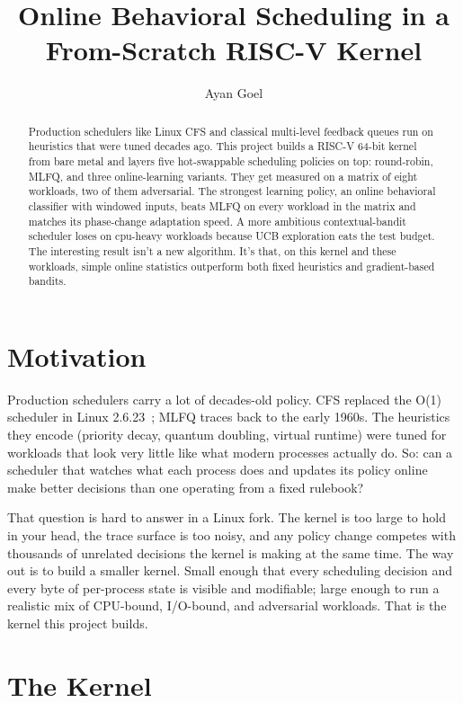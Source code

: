 \documentclass[11pt]{article}
\title{Online Behavioral Scheduling in a From-Scratch RISC-V Kernel}
\author{Ayan Goel}
\date{}
\begin{document}
\maketitle

\begin{abstract}
\noindent
Production schedulers like Linux CFS and classical multi-level feedback
queues run on heuristics that were tuned decades ago. This project builds a
RISC-V 64-bit kernel from bare metal and layers five hot-swappable scheduling
policies on top: round-robin, MLFQ, and three online-learning variants. They
get measured on a matrix of eight workloads, two of them adversarial. The
strongest learning policy, an online behavioral classifier with windowed
inputs, beats MLFQ on every workload in the matrix and matches its
phase-change adaptation speed. A more ambitious contextual-bandit scheduler
loses on cpu-heavy workloads because UCB exploration eats the test budget.
The interesting result isn't a new algorithm. It's that, on this kernel and
these workloads, simple online statistics outperform both fixed heuristics
and gradient-based bandits.
\end{abstract}

\section{Motivation}
\label{sec:motivation}

Production schedulers carry a lot of decades-old policy. CFS replaced the
O(1) scheduler in Linux 2.6.23~\cite{cfs}; MLFQ traces back to the early
1960s. The heuristics they encode (priority decay, quantum doubling, virtual
runtime) were tuned for workloads that look very little like what modern
processes actually do. So: can a scheduler that watches what each process
does and updates its policy online make better decisions than one operating
from a fixed rulebook?

That question is hard to answer in a Linux fork. The kernel is too large to
hold in your head, the trace surface is too noisy, and any policy change
competes with thousands of unrelated decisions the kernel is making at the
same time. The way out is to build a smaller kernel. Small enough that every
scheduling decision and every byte of per-process state is visible and
modifiable; large enough to run a realistic mix of CPU-bound, I/O-bound, and
adversarial workloads. That is the kernel this project builds.

\section{The Kernel}
\label{sec:kernel}
\end{document}
